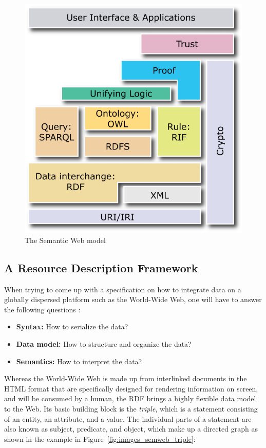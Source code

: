 \begin{figure}[!ht]
	\centering
		\includegraphics[width=0.8\columnwidth]{images/semantic_web_layers.png}
	\caption[The Semantic Web model]{The Semantic Web model \citep{W3C2013}}
\label{fig:images_semweb_model}
\end{figure}


\subsection{A Resource Description Framework}
\label{sec:semantic_rdf}

When trying to come up with a specification on how to integrate data on a globally dispersed platform such as the World-Wide Web, one will have to answer the following questions \citep[pg.23-25]{antoniou2012semantic}: \@

\begin{itemize}
	\item \textbf{Syntax:} How to serialize the data?
	\item \textbf{Data model:} How to structure and organize the data?
	\item \textbf{Semantics:} How to interpret the data?
\end{itemize}

Whereas the World-Wide Web is made up from interlinked documents in the \gls{HTML} format that are specifically designed for rendering information on screen, and will be consumed by a human, the \gls{RDF} brings a highly flexible data model to the Web. Its basic building block is the \emph{triple}, which is a statement consisting of an entity, an attribute, and a value. The individual parts of a statement are also known as subject, predicate, and object, which make up a directed graph as shown in the example in Figure~\ref{fig:images_semweb_triple}: \@

